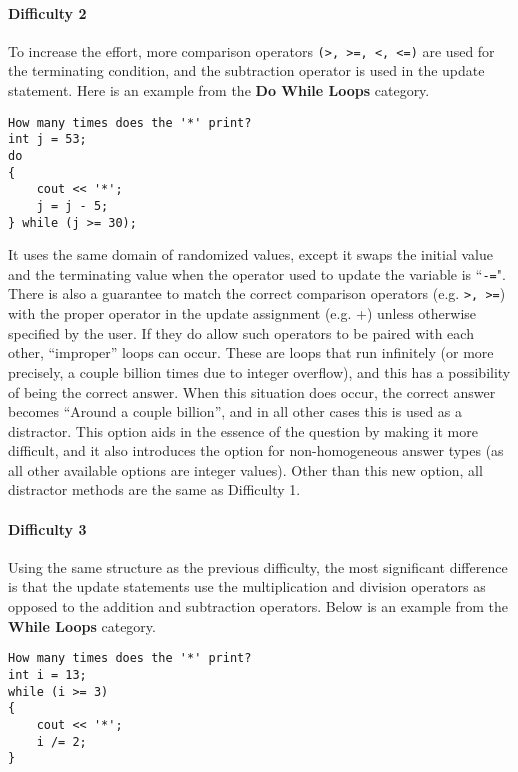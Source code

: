 \documentclass{article}
\begin{document}
\paragraph{Difficulty 2} \hfill \par
To increase the effort, more comparison operators \verb;(>, >=, <, <=); are used for the terminating condition, and the subtraction operator is used in the update
statement. Here is an example from the \textbf{Do While Loops} category.

\begin{lstlisting}
How many times does the '*' print? 
int j = 53;
do 
{
	cout << '*'; 
	j = j - 5; 
} while (j >= 30); 
\end{lstlisting}


 It uses the same domain of randomized values, except it swaps the initial value and the terminating value when the operator used to update the variable is ``\verb;-=;". There is also a 
guarantee to match the correct comparison operators (e.g. \verb;>, >=;) with the proper operator in the update assignment (e.g. +) unless otherwise specified by the user.
If they do allow such operators to be paired with each other, ``improper'' loops can occur. These are loops that run infinitely (or more precisely, a couple billion times due to integer overflow), 
and this has a possibility of being the correct answer. When this situation does occur, the correct answer becomes ``Around a couple billion'', and in all other cases this is used as a distractor. This 
option aids in the essence of the question by making it more difficult, and it also introduces the option for non-homogeneous answer types (as all other available options are integer values). 
Other than this new option, all distractor methods are the same as Difficulty 1.

\paragraph{Difficulty 3} \hfill \par 
Using the same structure as the previous difficulty, the most significant difference is that the update statements use the multiplication and division operators as opposed to the addition
and subtraction operators. Below is an example from the \textbf{While Loops} category.

\begin{lstlisting}[breaklines=true, float]
How many times does the '*' print?
int i = 13; 
while (i >= 3) 
{
	cout << '*'; 
	i /= 2;
}
\end{lstlisting}
\end{document}
